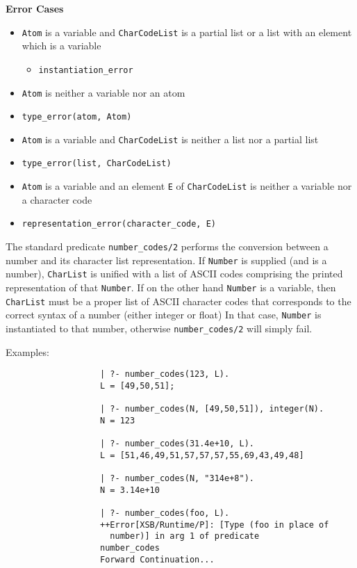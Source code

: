 \begin{description}
{\bf Error Cases}
\begin{itemize}
\item {\tt Atom} is a variable and {\tt CharCodeList} is a partial
  list or a list with an element which is a variable
\begin{itemize}
\item {\tt instantiation\_error}
\end{itemize}
\item {\tt Atom} is neither a variable nor an atom 
\bi
\item {\tt type\_error(atom, Atom)}
\ei
\item {\tt Atom} is a variable and {\tt CharCodeList} is neither a
  list nor a partial list 
\bi
\item {\tt type\_error(list, CharCodeList)}
\ei
\item {\tt Atom} is a variable and an element {\tt E} of {\tt CharCodeList} is neither a
variable nor a character code
\bi
\item {\tt representation\_error(character\_code, E)}
\ei
\end{itemize}

%
    The standard predicate {\tt number\_codes/2} performs the conversion 
    between a number and its character list representation. 
    If {\tt Number} is supplied (and is a number), {\tt CharList} is
    unified with a list of ASCII codes comprising the printed representation
    of that {\tt Number}.  If on the other hand {\tt Number} is a variable, 
    then {\tt CharList} must be a proper list of ASCII character codes that
    corresponds to the correct syntax of a number (either integer or float)
    In that case, {\tt Number} is instantiated to that number, otherwise
    {\tt number\_codes/2} will simply fail.

    Examples:
    {\footnotesize
     \begin{verbatim}
                   | ?- number_codes(123, L).
                   L = [49,50,51];

                   | ?- number_codes(N, [49,50,51]), integer(N).
                   N = 123

                   | ?- number_codes(31.4e+10, L).
                   L = [51,46,49,51,57,57,57,55,69,43,49,48]

                   | ?- number_codes(N, "314e+8").
                   N = 3.14e+10

                   | ?- number_codes(foo, L).
                   ++Error[XSB/Runtime/P]: [Type (foo in place of
                     number)] in arg 1 of predicate 
                   number_codes
                   Forward Continuation...
     \end{verbatim}}


\end{description}
